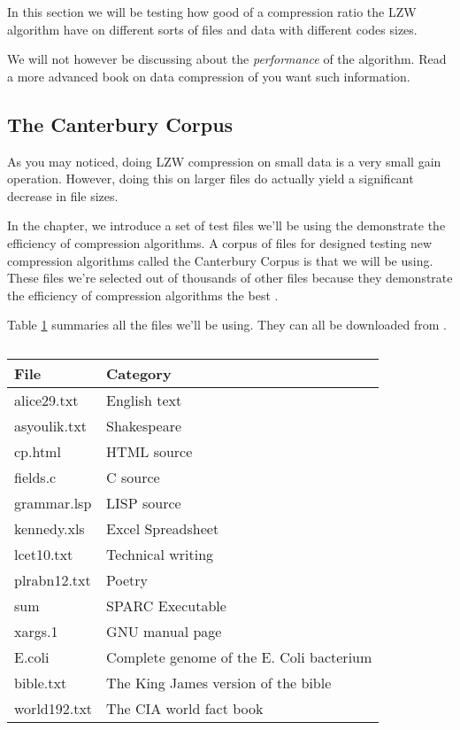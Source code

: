 In this section we will be testing how good of a compression ratio the
LZW algorithm have on different sorts of files and data with
different codes sizes.

We will not however be discussing about the \textit{performance} of
the algorithm. Read a more advanced book on data compression of you
want such information.

\subsection{The Canterbury Corpus}

As you may noticed, doing LZW compression on small data is a very small
gain operation. However, doing this on larger files do actually yield a
significant decrease in file sizes.

In the chapter, we introduce a set of test files we'll be using the
demonstrate the efficiency of compression algorithms. A corpus of
files for designed testing new compression algorithms called the
Canterbury Corpus is that we will be using. These files we're selected
out of thousands of other files because they demonstrate the
efficiency of compression algorithms the best \cite{arnold:corpus}.

Table \ref{tab:corp-files} summaries all the files we'll be using. They can all be
downloaded from \cite{powell:desc-corp}.

\begin{table}
  \centering
  \begin{tabular}{ll}
    \toprule
    File & Category \\
    \midrule
    alice29.txt & English text \\
    asyoulik.txt & Shakespeare \\
    cp.html & HTML source \\
    fields.c & C source \\
    grammar.lsp & LISP source \\
    kennedy.xls & Excel Spreadsheet \\
    lcet10.txt & Technical writing \\
    plrabn12.txt & Poetry \\
    sum & SPARC Executable \\
    xargs.1 & GNU manual page \\
    E.coli & Complete genome of the E. Coli bacterium \\
    bible.txt & The King James version of the bible \\
    world192.txt & The CIA world fact book \\
    \bottomrule
  \end{tabular}
  \caption{}
  \label{tab:corp-files}
\end{table}

